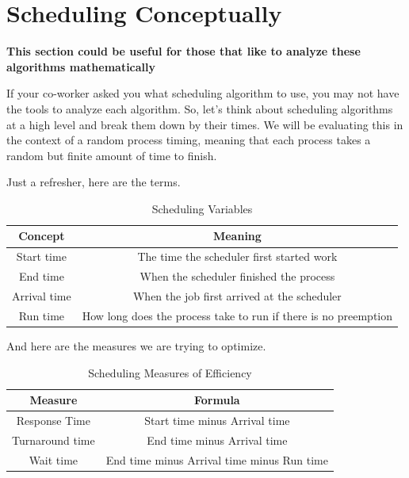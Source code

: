 \section{Scheduling Conceptually}\label{sec:scheduling_conceptually}

\textbf{This section could be useful for those that like to analyze these algorithms mathematically}

If your co-worker asked you what scheduling algorithm to use, you may not have the tools to analyze each algorithm.
So, let's think about scheduling algorithms at a high level and break them down by their times.
We will be evaluating this in the context of a random process timing, meaning that each process takes a random but finite amount of time to finish.

Just a refresher, here are the terms.

\begin{center}
\begin{table}[h]
\caption{Scheduling Variables}
\begin{tabular}{|c|c|}
  Concept & Meaning \\ \hline
  Start time & The time the scheduler first started work \\
  End time & When the scheduler finished the process \\
  Arrival time & When the job first arrived at the scheduler \\
  Run time & How long does the process take to run if there is no preemption
\end{tabular}
\end{table}
\end{center}

And here are the measures we are trying to optimize.

\begin{center}
\begin{table}[h]
\caption{Scheduling Measures of Efficiency}
\begin{tabular}{|c|c|}
  Measure & Formula \\ \hline
  Response Time & Start time minus Arrival time\\
  Turnaround time & End time minus Arrival time\\
  Wait time & End time minus Arrival time minus Run time \\
\end{tabular}
\end{table}
\end{center}

